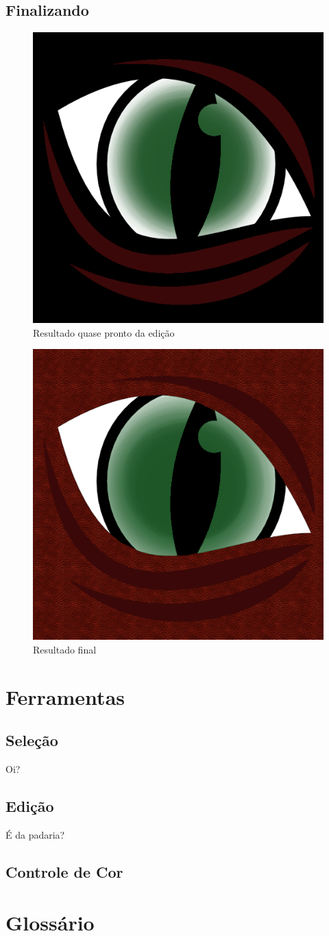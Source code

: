 \documentclass[12pt,onecolumn]{article}
\begin{document}
  \subsection{Finalizando}
    \begin{figure}[H]
      \centering
      \includegraphics[width=.5\textwidth]{screenshots/06-partial.png}
      \caption{Resultado quase pronto da edição}
      \label{fig:partial}
    \end{figure}
    \begin{figure}[H]
      \centering
      \includegraphics[width=.7\linewidth]{draft00.png}
      \caption{Resultado final}
      \label{fig:final}
    \end{figure}
    
\section{Ferramentas}

  \subsection{Seleção}
    Oi?

  \subsection{Edição}
    É da padaria?
    
  \subsection{Controle de Cor}

\section{Glossário}
\end{document}
